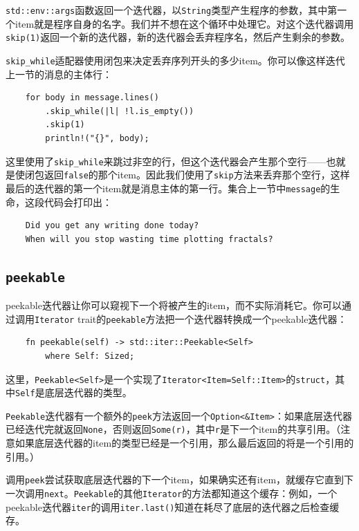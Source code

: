 \texttt{std::env::args}函数返回一个迭代器，以\texttt{String}类型产生程序的参数，其中第一个item就是程序自身的名字。我们并不想在这个循环中处理它。对这个迭代器调用\texttt{skip(1)}返回一个新的迭代器，新的迭代器会丢弃程序名，然后产生剩余的参数。

\texttt{skip\_while}适配器使用闭包来决定丢弃序列开头的多少item。你可以像这样迭代上一节的消息的主体行：
\begin{verbatim}
    for body in message.lines()
        .skip_while(|l| !l.is_empty())
        .skip(1)
        println!("{}", body);
\end{verbatim}

这里使用了\texttt{skip\_while}来跳过非空的行，但这个迭代器会产生那个空行——也就是使闭包返回\texttt{false}的那个item。因此我们使用了\texttt{skip}方法来丢弃那个空行，这样最后的迭代器的第一个item就是消息主体的第一行。集合上一节中\texttt{message}的生命，这段代码会打印出：
\begin{verbatim}
    Did you get any writing done today?
    When will you stop wasting time plotting fractals?
\end{verbatim}

\subsection{\texttt{peekable}}
peekable迭代器让你可以窥视下一个将被产生的item，而不实际消耗它。你可以通过调用\texttt{Iterator} trait的\texttt{peekable}方法把一个迭代器转换成一个peekable迭代器：
\begin{verbatim}
    fn peekable(self) -> std::iter::Peekable<Self>
        where Self: Sized;
\end{verbatim}
这里，\texttt{Peekable<Self>}是一个实现了\texttt{Iterator<Item=Self::Item>}的\texttt{struct}，其中\texttt{Self}是底层迭代器的类型。

\texttt{Peekable}迭代器有一个额外的\texttt{peek}方法返回一个\texttt{Option<\&Item>}：如果底层迭代器已经迭代完就返回\texttt{None}，否则返回\texttt{Some(r)}，其中\texttt{r}是下一个item的共享引用。（注意如果底层迭代器的item的类型已经是一个引用，那么最后返回的将是一个引用的引用。）

调用\texttt{peek}尝试获取底层迭代器的下一个item，如果确实还有item，就缓存它直到下一次调用\texttt{next}。\texttt{Peekable}的其他\texttt{Iterator}的方法都知道这个缓存：例如，一个peekable迭代器\texttt{iter}的调用\texttt{iter.last()}知道在耗尽了底层的迭代器之后检查缓存。


